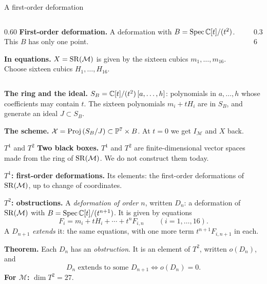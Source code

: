 
\begin{frame}{A first-order deformation}
\begin{columns}[c]
\begin{column}{0.60\textwidth}
\textbf{First-order deformation.} A deformation with \(B=\operatorname{Spec}\mathbb C[t]/(t^2)\). This \(B\) has only one point.
\par
\textbf{In equations.} \(X=\operatorname{SR}(\mathcal M)\) is given by the sixteen cubics \(m_1,\dots,m_{16}\). Choose sixteen cubics \(H_1,\dots,H_{16}\).
\end{column}
\begin{column}{0.36\textwidth}\centering
{}
\end{column}
\end{columns}
\par
\textbf{The ring and the ideal.} \(S_B=\mathbb C[t]/(t^2)\,[a,\dots,h]\): polynomials in \(a,\dots,h\) whose coefficients may contain \(t\). The sixteen polynomials \(m_i+tH_i\) are in \(S_B\), and generate an ideal \(J\subset S_B\).
\par
\textbf{The scheme.} \(\mathcal X=\operatorname{Proj}\,(S_B/J)\subset\mathbb P^7\times B\). At \(t=0\) we get \(I_{\mathcal M}\) and \(X\) back.
\end{frame}

\begin{frame}{\(T^1\) and \(T^2\)}
\textbf{Two black boxes.} \(T^1\) and \(T^2\) are finite-dimensional vector spaces made from the ring of \(\operatorname{SR}(\mathcal M)\). We do not construct them today.
\par
\textbf{\(T^1\): first-order deformations.} Its elements: the first-order deformations of \(\operatorname{SR}(\mathcal M)\), up to change of coordinates.
\par
\textbf{\(T^2\): obstructions.} A \emph{deformation of order \(n\)}, written \(D_n\): a deformation of \(\operatorname{SR}(\mathcal M)\) with \(B=\operatorname{Spec}\mathbb C[t]/(t^{n+1})\). It is given by equations
\[
F_i=m_i+tH_i+\cdots+t^nF_{i,n}\qquad(i=1,\dots,16).
\]
A \(D_{n+1}\) \emph{extends} it: the same equations, with one more term \(t^{n+1}F_{i,n+1}\) in each.
\par
\textbf{Theorem.} Each \(D_n\) has an \emph{obstruction}. It is an element of \(T^2\), written \(o(D_n)\), and
\[
\boxed{D_n\text{ extends to some }D_{n+1}\iff o(D_n)=0.}
\]
\textbf{For \(\mathcal M\):} \(\dim T^2=27\).
\end{frame}

